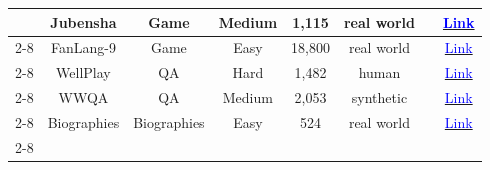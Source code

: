 \begin{table}[!htp]
{\begin{tabular}{c|c|c|c|c|c|c|c}
                                                                                  & Jubensha               & Game                    & Medium              & 1,115            & real world          & \cite{wu2023deciphering}                                                                                                                                                        & \href{https://github.com/jackwu502/ThinkThrice}{\textcolor{blue}{Link}}                                                                                           \\ \cline{2-8}
                                                                                  & FanLang-9              & Game                    & Easy                & 18,800           & real world          & \cite{wu2024enhance}                                                                                                                                                            & \href{https://github.com/boluoweifenda/werewolf}{\textcolor{blue}{Link}}                                                                                          \\ \cline{2-8}
                                                                                  & WellPlay               & QA                      & Hard                & 1,482            & human               & \cite{zhu2024player}                                                                                                                                                            & \href{https://github.com/alickzhu/PLAYER}{\textcolor{blue}{Link}}                                                                                                 \\ \cline{2-8}
                                                                                  & WWQA                   & QA                      & Medium              & 2,053            & synthetic           & \cite{du2024helmsman}                                                                                                                                                           & \href{https://github.com/doslim/Evaluate-the-Opinion-Leadership-of-LLMs}{\textcolor{blue}{Link}}                                                                  \\ \cline{2-8}
                                                                                  & Biographies            & Biographies             & Easy                & 524              & real world          & \cite{du2023improving}                                                                                                                                                          & \href{https://github.com/composable-models/llm_multiagent_debate}{\textcolor{blue}{Link}}                                                                         \\ \cline{2-8}

\end{tabular}}
\end{table}
